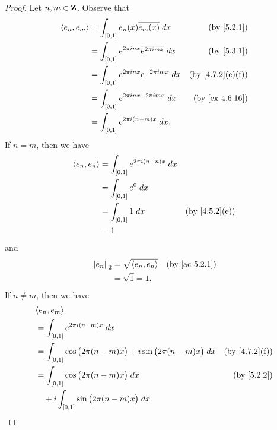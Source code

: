 \begin{proof}
  Let \(n, m \in \mathbf{Z}\).
  Observe that
  \begin{align*}
    \inner*{e_n, e_m} & = \int_{[0, 1]} e_n(x) \overline{e_m(x)} \; dx                   & \text{(by \cref{5.2.1})}       \\
                      & = \int_{[0, 1]} e^{2 \pi i n x} \overline{e^{2 \pi i m x}} \; dx & \text{(by \cref{5.3.1})}       \\
                      & = \int_{[0, 1]} e^{2 \pi i n x} e^{- 2 \pi i m x} \; dx          & \text{(by \cref{4.7.2}(c)(f))} \\
                      & = \int_{[0, 1]} e^{2 \pi i n x - 2 \pi i m x} \; dx              & \text{(by \cref{ex 4.6.16})}   \\
                      & = \int_{[0, 1]} e^{2 \pi i (n - m) x} \; dx.
  \end{align*}
  If \(n = m\), then we have
  \begin{align*}
    \inner*{e_n, e_n} & = \int_{[0, 1]} e^{2 \pi i (n - n) x} \; dx                               \\
                      & = \int_{[0, 1]} e^0 \; dx                                                 \\
                      & = \int_{[0, 1]} 1 \; dx                     & \text{(by \cref{4.5.2}(e))} \\
                      & = 1
  \end{align*}
  and
  \begin{align*}
    \norm*{e_n}_2 & = \sqrt{\inner*{e_n, e_n}} & \text{(by \cref{ac 5.2.1})} \\
                  & = \sqrt{1} = 1.
  \end{align*}
  If \(n \neq m\), then we have
  \begin{align*}
     & \inner*{e_n, e_m}                                                                                                            \\
     & = \int_{[0, 1]} e^{2 \pi i (n - m) x} \; dx                                                                                  \\
     & = \int_{[0, 1]} \cos\big(2 \pi (n - m) x\big) + i \sin\big(2 \pi (n - m) x\big) \; dx       & \text{(by \cref{4.7.2}(f))}    \\
     & = \int_{[0, 1]} \cos\big(2 \pi (n - m) x\big) \; dx                                         & \text{(by \cref{5.2.2})}       \\
     & \quad + i \int_{[0, 1]} \sin\big(2 \pi (n - m) x\big) \; dx                                                                  \\

\end{align*}
\end{proof}
